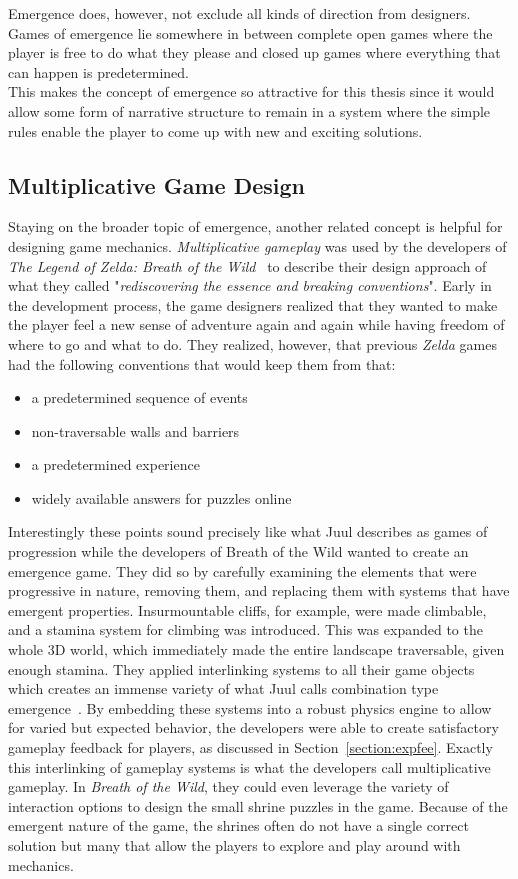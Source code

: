 Emergence does, however, not exclude all kinds of direction from designers. Games of emergence lie somewhere in between complete open games where the player is free to do what they please and closed up games where everything that can happen is predetermined.~\cite{Juul2002}\\ 
This makes the concept of emergence so attractive for this thesis since it would allow some form of narrative structure to remain in a system where the simple rules enable the player to come up with new and exciting solutions.
\subsection{Multiplicative Game Design}
Staying on the broader topic of emergence, another related concept is helpful for designing game mechanics. \textit{Multiplicative gameplay} was used by the developers of \textit{The Legend of Zelda: Breath of the Wild}~\cite{zeldabotw} to describe their design approach of what they called "\textit{rediscovering the essence and breaking conventions}". Early in the development process, the game designers realized that they wanted to make the player feel a new sense of adventure again and again while having freedom of where to go and what to do. They realized, however, that previous \textit{Zelda} games had the following conventions that would keep them from that:
\begin{itemize}
	\item a predetermined sequence of events
	\item non-traversable walls and barriers
	\item a predetermined experience
	\item widely available answers for puzzles online
\end{itemize}
Interestingly these points sound precisely like what Juul describes as games of progression while the developers of Breath of the Wild wanted to create an emergence game. They did so by carefully examining the elements that were progressive in nature, removing them, and replacing them with systems that have emergent properties. Insurmountable cliffs, for example, were made climbable, and a stamina system for climbing was introduced. This was expanded to the whole 3D world, which immediately made the entire landscape traversable, given enough stamina. They applied interlinking systems to all their game objects which creates an immense variety of what Juul calls combination type emergence~\cite{Juul2002}. By embedding these systems into a robust physics engine to allow for varied but expected behavior, the developers were able to create satisfactory gameplay feedback for players, as discussed in Section~\ref{section:expfee}. Exactly this interlinking of gameplay systems is what the developers call multiplicative gameplay. In \textit{Breath of the Wild}, they could even leverage the variety of interaction options to design the small shrine puzzles in the game. Because of the emergent nature of the game, the shrines often do not have a single correct solution but many that allow the players to explore and play around with mechanics.~\cite{fujibayashi2017}
